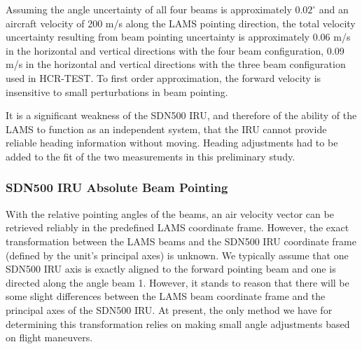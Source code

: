\documentclass[12pt,twoside,english]{article}\usepackage[]{graphicx}\usepackage[]{color}
\begin{document}
{{Assuming the angle uncertainty of all four beams is approximately $0.02^{\circ}$ and an aircraft velocity of 200 m/s along the LAMS pointing direction, the total velocity uncertainty resulting from beam pointing uncertainty is approximately 0.06 m/s in the horizontal and vertical directions with the four beam configuration, 0.09 m/s in the horizontal and vertical directions with the three beam configuration used in HCR-TEST. To first order approximation, the forward velocity is insensitive to small perturbations in beam pointing. 


It is a significant weakness of the SDN500 IRU, and therefore of the ability of the LAMS to function as an independent system, that the IRU cannot provide reliable heading information without moving. Heading adjustments had to be added to the fit of the two measurements in this preliminary study.

\subsubsection{SDN500 IRU Absolute Beam Pointing\label{sub:Absolute}}

With the relative pointing angles of the beams, an air velocity vector can be retrieved reliably in the predefined LAMS coordinate frame. However, the exact transformation between the LAMS beams and the SDN500 IRU coordinate frame (defined by the unit's principal axes) is unknown. We typically assume that one SDN500 IRU axis is exactly aligned to the forward pointing beam and one is directed along the angle beam 1. However, it stands to reason that there will be some slight differences between the LAMS beam coordinate frame and the principal axes of the SDN500 IRU. At present, the only method we have for determining this transformation relies on making small angle adjustments based on flight maneuvers. 

}}
\end{document}
